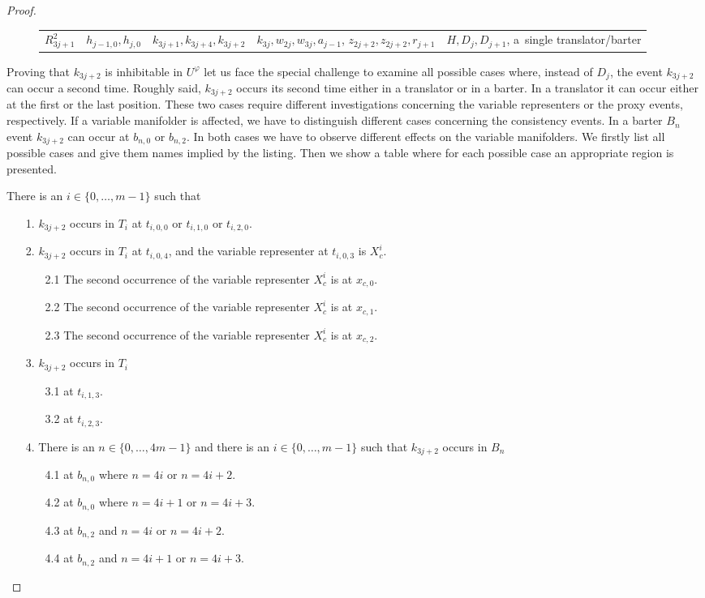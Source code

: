 \documentclass[english]{lipics_hacked}
\begin{document}
\begin{proof}
\begin{figure}[H]
\begin{tabular}{p{1cm} p{3.5cm}   p{2.5cm}    p{2.5cm}      p{2.7cm}  }
$R_{3j+1}^2$ & $h_{j-1,0},h_{j,0}$& $k_{3j+1},k_{3j+4}, k_{3j+2}$& $k_{3j},w_{2j},w_{3j},a_{j-1}$, $z_{2j+2},z_{2j+2},r_{j+1}$ & $H,D_j,D_{j+1}$, a~single translator/barter  \end{tabular}
\end{figure}
%
Proving that $k_{3j+2}$ is inhibitable in $U^\varphi$ let us face the special challenge to examine all possible cases where, instead of $D_j$, the event $k_{3j+2}$ can occur a second time.
Roughly said, $k_{3j+2}$ occurs its second time either in a translator or in a barter. 
In a translator it can occur either at the first or the last position.
These two cases require different investigations concerning the variable representers or the proxy events, respectively.
If a variable manifolder is affected, we have to distinguish different cases concerning the consistency events.
In a barter $B_n$ event $k_{3j+2}$ can occur at $b_{n,0}$ or $b_{n,2}$.
In both cases we have to observe different effects on the variable manifolders.
We firstly list all possible cases and give them names implied by the listing.
Then we show a table where for each possible case an appropriate region is presented.

There is an $i\in \{0,\dots,m-1\}$ such that
\begin{itemize}
\item[1.]  $k_{3j+2}$ occurs in $T_i$ at $t_{i,0,0}$ or $t_{i,1,0}$ or $t_{i,2,0}$.
\item[2.] $k_{3j+2}$ occurs in $T_i$ at $t_{i,0,4}$, and the variable representer at $t_{i,0,3}$ is $X^{i}_c$.
	\begin{itemize}
		\item[2.1] The second occurrence of the variable representer $X^{i}_c$ is at $x_{c,0}$.
		\item[2.2]The second occurrence of the variable representer $X^{i}_c$ is at $x_{c,1}$.
		\item[2.3]The second occurrence of the variable representer $X^{i}_c$ is at $x_{c,2}$.
	\end{itemize}
\item[3.] $k_{3j+2}$ occurs in $T_i$ 
	\begin{itemize}
		\item[3.1] at $t_{i,1,3}$. 
		\item[3.2] at $t_{i,2,3}$.
	\end{itemize}
\item[4.] There is an $n\in \{0,\dots,4m-1\}$  and there is an $i\in \{0,\dots,m-1\}$ such that $k_{3j+2}$ occurs in $B_{n}$
	\begin{itemize}
		\item[4.1]  at $b_{n,0}$ where $n=4i$ or $n=4i+2$.
		\item[4.2] at $b_{n,0}$ where $n=4i+1$ or $n=4i+3$. 
		\item[4.3]  at $b_{n,2}$  and $n=4i$ or $n=4i+2$.
		\item[4.4]  at $b_{n,2}$ and $n=4i+1$ or $n=4i+3$.
	\end{itemize}
\end{itemize}


\end{proof}
\end{document}
